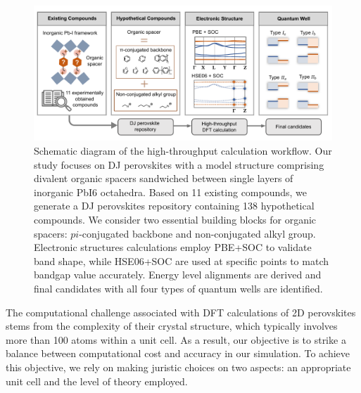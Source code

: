\begin{figure}[!ht]
\centering
\includegraphics[width=\textwidth]{figures/high-throughput-calculation/figure1.pdf}
\caption[Schematic diagram of the high-throughput calculation workflow.]{Schematic diagram of the high-throughput calculation workflow. Our study focuses on DJ perovskites with a model structure comprising divalent organic spacers sandwiched between single layers of inorganic PbI6 octahedra. Based on 11 existing compounds, we generate a DJ perovskites repository containing 138 hypothetical compounds. We consider two essential building blocks for organic spacers: $pi$-conjugated backbone and non-conjugated alkyl group. Electronic structures calculations employ PBE+SOC to validate band shape, while HSE06+SOC are used at specific points to match bandgap value accurately. Energy level alignments are derived and final candidates with all four types of quantum wells are identified. }
\label{f:fig1}
\end{figure}
 
The computational challenge associated with DFT calculations of 2D perovskites stems from the complexity of their crystal structure, which typically involves more than 100 atoms within a unit cell. As a result, our objective is to strike a balance between computational cost and accuracy in our simulation. To achieve this objective, we rely on making juristic choices on two aspects: an appropriate unit cell and the level of theory employed.

